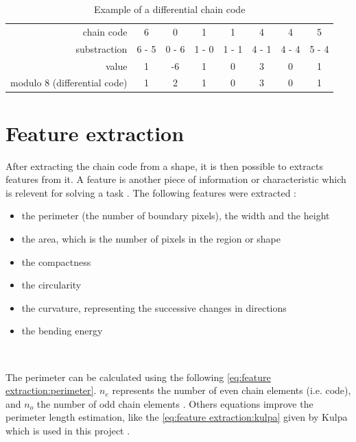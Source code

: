\begin{table}[ht]
	\centering
	\caption{Example of a differential chain code}
	\label{tab:chain code:differential chain code}
	\begin{tabular}{rccccccc}
\toprule 
chain code   & 6     & 0     & 1     & 1     & 4     & 4     & 5     \\
substraction & 6 - 5 & 0 - 6 & 1 - 0 & 1 - 1 & 4 - 1 & 4 - 4 & 5 - 4 \\
value     	 & 1     & -6    & 1     & 0     & 3     & 0     & 1     \\
modulo 8 (differential code)  	 & 1     & 2     & 1     & 0     & 3     & 0     & 1     \\ 
\bottomrule 
	\end{tabular}
\end{table}






\section{Feature extraction}

After extracting the chain code from a shape, it is then possible to extracts features from it. A feature is another piece of information or characteristic which is relevent for solving a task \cite{bib:extraction:definition}. The following features were extracted : 
\begin{itemize}
	\item the perimeter (the number of boundary pixels), the width and the height
	\item the area, which is the number of pixels in the region or shape 
	\item the compactness 
	\item the circularity 
	\item the curvature, representing the successive changes in directions 
	\item the bending energy 
\end{itemize}

~~ 

The perimeter can be calculated using the following \vref{eq:feature extraction:perimeter}. $n_e$ represents the number of even chain elements (i.e. code), and $n_o$ the number of odd chain elements \cite{bib:chain:EstimateAreasAndPerimetersChainCode}. Others equations improve the perimeter length estimation, like the \vref{eq:feature extraction:kulpa} given by Kulpa which is used in this project \cite{bib:chain:ObjectDescription}.

